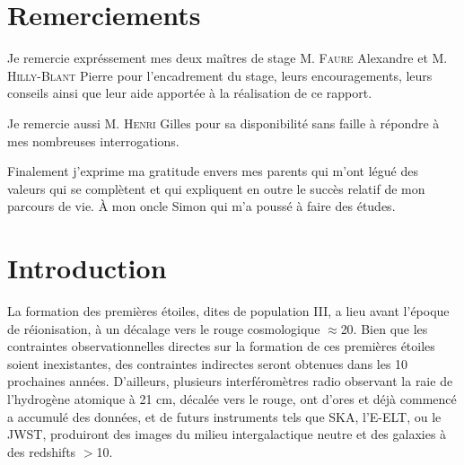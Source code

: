 \documentclass[10pt, a4paper]{report}
\numberwithin{equation}{subsection}
\begin{document}
\renewcommand{\contentsname}{Sommaire}
\renewcommand{\bibname}{Références}



\tableofcontents


\chapter*{Remerciements}
Je remercie expréssement mes deux maîtres de stage M. \textsc{Faure} Alexandre et M. \textsc{Hilly-Blant} Pierre pour l'encadrement du stage, leurs encouragements, leurs conseils ainsi que leur aide apportée à la réalisation de ce rapport.

Je remercie aussi M. \textsc{Henri} Gilles pour sa disponibilité sans faille à répondre à mes nombreuses interrogations.

Finalement j'exprime ma gratitude envers mes parents qui m'ont légué des valeurs qui se complètent et qui expliquent en outre le succès relatif de mon parcours de vie. À mon oncle Simon qui m'a poussé à faire des études.
 

\chapter*{Introduction}
La formation des premières étoiles, dites de population III, a lieu avant l'époque de réionisation, à un décalage vers le rouge cosmologique $\approx$20. Bien que les contraintes observationnelles directes sur la formation de ces premières étoiles soient inexistantes, des contraintes indirectes seront obtenues dans les 10 prochaines années. D'ailleurs, plusieurs interféromètres radio observant la raie de l'hydrogène atomique à 21 cm, décalée vers le rouge, ont d'ores et déjà commencé a accumulé des données, et de futurs instruments tels que SKA, l'E-ELT, ou le JWST, produiront des images du milieu intergalactique neutre et des galaxies à des redshifts $>$10.
\end{document}
